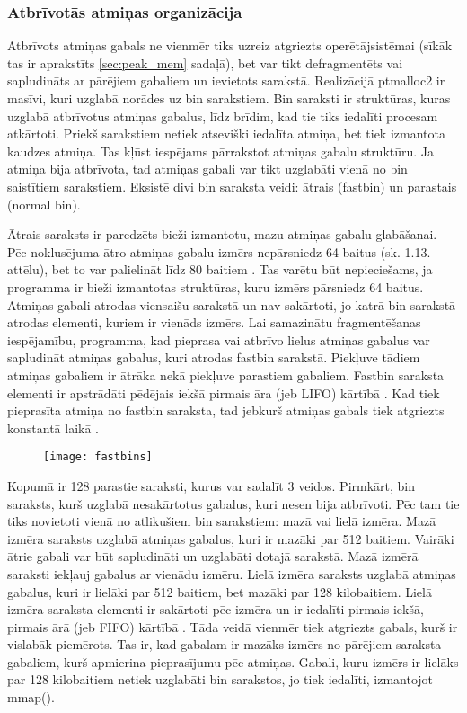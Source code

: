  \subsubsection{Atbrīvotās atmiņas organizācija}
 \label{subsec:bin_saraksti}
Atbrīvots atmiņas gabals ne vienmēr tiks uzreiz atgriezts operētājsistēmai (sīkāk tas ir aprakstīts \ref{sec:peak_mem} sadaļā), bet var tikt defragmentēts vai sapludināts ar pārējiem gabaliem un ievietots sarakstā. 
Realizācijā ptmalloc2 ir masīvi, kuri uzglabā norādes uz bin sarakstiem.
Bin saraksti ir struktūras, kuras uzglabā atbrīvotus atmiņas gabalus, līdz brīdim, kad tie tiks iedalīti procesam atkārtoti.
Priekš sarakstiem netiek atsevišķi iedalīta atmiņa, bet tiek izmantota kaudzes atmiņa.
Tas kļūst iespējams pārrakstot atmiņas gabalu struktūru.
Ja atmiņa bija atbrīvota, tad atmiņas gabali var tikt uzglabāti vienā no bin saistītiem sarakstiem.
Eksistē divi bin saraksta veidi: ātrais (fastbin) un parastais (normal bin).


Ātrais saraksts ir paredzēts bieži izmantotu, mazu atmiņas gabalu glabāšanai.
Pēc noklusējuma ātro atmiņas gabalu izmērs nepārsniedz 64 baitus (sk. 1.13. attēlu), bet to var palielināt līdz 80 baitiem \cite {MALLOC}. 
Tas varētu būt nepieciešams, ja programma ir bieži izmantotas struktūras, kuru izmērs pārsniedz 64 baitus.
Atmiņas gabali atrodas viensaišu sarakstā un nav sakārtoti, jo katrā bin sarakstā atrodas elementi, kuriem ir vienāds izmērs.
Lai samazinātu fragmentēšanas iespējamību, programma, kad pieprasa vai atbrīvo lielus atmiņas gabalus var sapludināt atmiņas gabalus, kuri atrodas fastbin sarakstā.
Piekļuve tādiem atmiņas gabaliem ir ātrāka nekā piekļuve parastiem gabaliem. 
Fastbin saraksta elementi ir apstrādāti pēdējais iekšā pirmais āra (jeb LIFO) kārtībā \cite {Binning}.
Kad tiek pieprasīta atmiņa no fastbin saraksta, tad jebkurš atmiņas gabals tiek atgriezts konstantā laikā  \cite {ACCA}.
\begin{figure}[h]
\begin{center}
\texttt{[image: fastbins]}
\end{center}
\caption{\textbf{\fontsize{11}{12}\selectfont {Ātrais saraksts}}}
\label{fig:fastbin}
\end{figure}

Kopumā ir 128 parastie saraksti, kurus var sadalīt 3 veidos. 
Pirmkārt, bin saraksts, kurš uzglabā nesakārtotus gabalus, kuri nesen bija atbrīvoti.  
Pēc tam tie tiks novietoti vienā no atlikušiem bin sarakstiem: mazā vai lielā izmēra. 
Mazā izmēra saraksts uzglabā atmiņas gabalus, kuri ir mazāki par 512 baitiem. 
Vairāki ātrie gabali var būt sapludināti un uzglabāti dotajā sarakstā. 
Mazā izmērā saraksti iekļauj gabalus ar vienādu izmēru. 
Lielā izmēra saraksts uzglabā atmiņas gabalus, kuri ir lielāki par 512 baitiem, bet mazāki par 128 kilobaitiem. 
Lielā izmēra saraksta elementi ir sakārtoti pēc izmēra un ir iedalīti pirmais iekšā, pirmais ārā (jeb FIFO) kārtībā \cite {Binning}. 
Tāda veidā vienmēr tiek atgriezts gabals, kurš ir vislabāk piemērots.
Tas ir, kad gabalam ir mazāks izmērs no pārējiem saraksta gabaliem, kurš apmierina pieprasījumu pēc atmiņas.
Gabali, kuru izmērs ir lielāks par 128 kilobaitiem netiek uzglabāti bin sarakstos, jo tiek iedalīti, izmantojot mmap(). 




